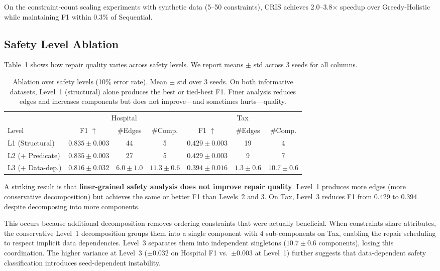 \documentclass{article}
\newcommand{\cris}{\textsc{CRIS}\xspace}
\begin{document}
On the constraint-count scaling experiments with synthetic data (5--50 constraints), \cris achieves 2.0--3.8$\times$ speedup over Greedy-Holistic while maintaining F1 within 0.3\% of Sequential.

\subsection{Safety Level Ablation}
\label{sec:ablation}

Table~\ref{tab:ablation} shows how repair quality varies across safety levels. We report means $\pm$ std across 3 seeds for all columns.

\begin{table}[t]
\caption{Ablation over safety levels (10\% error rate). Mean $\pm$ std over 3 seeds. On both informative datasets, Level~1 (structural) alone produces the best or tied-best F1. Finer analysis reduces edges and increases components but does not improve---and sometimes hurts---quality.}
\label{tab:ablation}
\centering
\small
\begin{tabular}{lcccccc}
\toprule
& \multicolumn{3}{c}{Hospital} & \multicolumn{3}{c}{Tax} \\
\cmidrule(lr){2-4} \cmidrule(lr){5-7}
Level & F1 $\uparrow$ & \#Edges & \#Comp. & F1 $\uparrow$ & \#Edges & \#Comp. \\
\midrule
L1 (Structural) & $\mathbf{0.835 \pm 0.003}$ & 44 & 5 & $\mathbf{0.429 \pm 0.003}$ & 19 & 4 \\
L2 (+ Predicate) & $0.835 \pm 0.003$ & 27 & 5 & $0.429 \pm 0.003$ & 9 & 7 \\
L3 (+ Data-dep.) & $0.816 \pm 0.032$ & $6.0 \pm 1.0$ & $11.3 \pm 0.6$ & $0.394 \pm 0.016$ & $1.3 \pm 0.6$ & $10.7 \pm 0.6$ \\
\bottomrule
\end{tabular}
\end{table}

A striking result is that \textbf{finer-grained safety analysis does not improve repair quality}. Level~1 produces more edges (more conservative decomposition) but achieves the same or better F1 than Levels~2 and 3. On Tax, Level~3 reduces F1 from 0.429 to 0.394 despite decomposing into more components.

This occurs because additional decomposition removes ordering constraints that were actually beneficial. When constraints share attributes, the conservative Level~1 decomposition groups them into a single component with 4 sub-components on Tax, enabling the repair scheduling to respect implicit data dependencies. Level~3 separates them into independent singletons ($10.7 \pm 0.6$ components), losing this coordination. The higher variance at Level~3 ($\pm 0.032$ on Hospital F1 vs.\ $\pm 0.003$ at Level~1) further suggests that data-dependent safety classification introduces seed-dependent instability.
\end{document}
